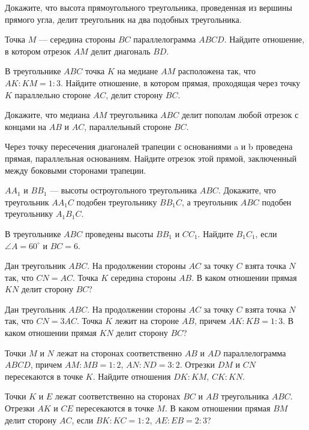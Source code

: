 \begin{tasks}
    \item Докажите, что высота прямоугольного треугольника, проведенная из вершины прямого угла, делит треугольник на два подобных треугольника.
    \item Точка $M$ --- середина стороны $BC$ параллелограмма $ABCD$. Найдите отношение, в котором отрезок $AM$ делит диагональ $BD$.
    \item В треугольнике $ABC$ точка $K$ на медиане $AM$ расположена так, что $AK : KM = 1 : 3$. Найдите отношение, в котором прямая, проходящая через точку $K$ параллельно стороне $AC$, делит сторону $BC$.
    \item Докажите, что медиана $AM$ треугольника $ABC$ делит пополам любой отрезок с концами на $AB$ и $AC$, параллельный стороне $BC$.
    \item {}
    \item Через точку пересечения диагоналей трапеции с основаниями a и b проведена прямая, параллельная основаниям. Найдите отрезок этой прямой, заключенный между боковыми сторонами трапеции.
    \item $AA_1$ и $BB_1$ --- высоты остроугольного треугольника $ABC$. Докажите, что треугольник $AA_1C$ подобен треугольнику $BB_1C$, а треугольник $ABC$ подобен треугольнику $A_1B_1C$.
    \item В треугольнике $ABC$ проведены высоты $BB_1$ и $CC_1$. Найдите $B_1C_1$, если $\angle A = 60^\circ$ и $BC = 6$.
    \item Дан треугольник $ABC$. На продолжении стороны $AC$ за точку $C$ взята точка $N$ так, что $CN = AC$. Точка $K$  середина стороны $AB$. В каком отношении прямая $KN$ делит сторону $BC$?
    \item Дан треугольник $ABC$. На продолжении стороны $AC$ за точку $C$ взята точка $N$ так, что $CN = 3AC$. Точка $K$ лежит на стороне $AB$, причем $AK : KB = 1 : 3$. В каком отношении прямая $KN$ делит сторону $BC$?
    \item Точки $M$ и $N$ лежат на сторонах соответственно $AB$ и $AD$ параллелограмма $ABCD$, причем $AM : MB = 1 : 2$, $AN : ND = 3 : 2$. Отрезки $DM$ и $CN$ пересекаются в точке $K$. Найдите отношения $DK : KM$, $CK : KN$.
    \item Точки $K$ и $E$ лежат соответственно на сторонах $BC$ и $AB$ треугольника $ABC$. Отрезки $AK$ и $CE$ пересекаются в точке $M$. В каком отношении прямая $BM$ делит сторону $AC$, если $BK : KC = 1 : 2$, $AE : EB = 2 : 3$?

\end{tasks}

